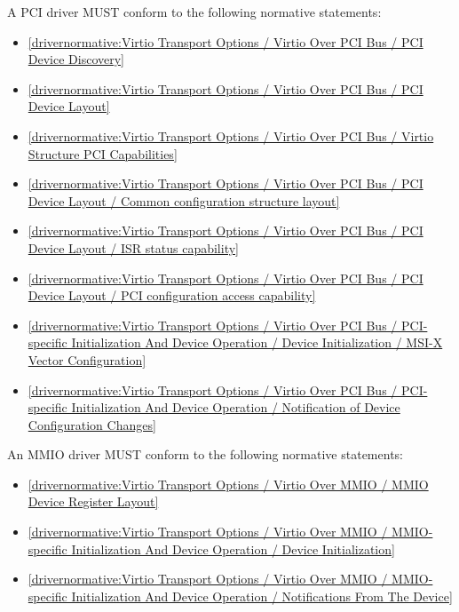 A PCI driver MUST conform to the following normative statements:

\begin{itemize}
\item \ref{drivernormative:Virtio Transport Options / Virtio Over PCI Bus / PCI Device Discovery}
\item \ref{drivernormative:Virtio Transport Options / Virtio Over PCI Bus / PCI Device Layout}
\item \ref{drivernormative:Virtio Transport Options / Virtio Over PCI Bus / Virtio Structure PCI Capabilities}
\item \ref{drivernormative:Virtio Transport Options / Virtio Over PCI Bus / PCI Device Layout / Common configuration structure layout}
\item \ref{drivernormative:Virtio Transport Options / Virtio Over PCI Bus / PCI Device Layout / ISR status capability}
\item \ref{drivernormative:Virtio Transport Options / Virtio Over PCI Bus / PCI Device Layout / PCI configuration access capability}
\item \ref{drivernormative:Virtio Transport Options / Virtio Over PCI Bus / PCI-specific Initialization And Device Operation / Device Initialization / MSI-X Vector Configuration}
\item \ref{drivernormative:Virtio Transport Options / Virtio Over PCI Bus / PCI-specific Initialization And Device Operation / Notification of Device Configuration Changes}
\end{itemize}

\label{sec:Conformance / Driver Conformance / MMIO Driver Conformance}

An MMIO driver MUST conform to the following normative statements:

\begin{itemize}
\item \ref{drivernormative:Virtio Transport Options / Virtio Over MMIO / MMIO Device Register Layout}
\item \ref{drivernormative:Virtio Transport Options / Virtio Over MMIO / MMIO-specific Initialization And Device Operation / Device Initialization}
\item \ref{drivernormative:Virtio Transport Options / Virtio Over MMIO / MMIO-specific Initialization And Device Operation / Notifications From The Device}
\end{itemize}

